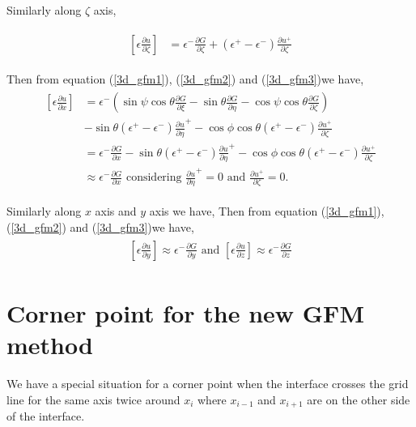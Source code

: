     Similarly along $\zeta $ axis, 
    
    \begin{eqnarray}
    \begin{aligned}
    \left[\epsilon \frac{\partial u}{\partial \zeta}\right]&= \epsilon^-\frac{\partial G}{\partial \zeta}+(\epsilon^+-\epsilon^-)\frac{\partial u^+}{\partial \zeta }\label{3d_gfm3}
    \end{aligned}
    \end{eqnarray}

    Then from equation (\ref{3d_gfm1}), (\ref{3d_gfm2}) and (\ref{3d_gfm3})we have,
    \begin{eqnarray}
    \begin{aligned}   
    		\left[\epsilon \frac{\partial u}{\partial x}\right]&= \epsilon^-\left( \sin \psi \cos \theta \frac{\partial G}{\partial \xi}-\sin \theta \frac{\partial G}{\partial \eta}-\cos \psi \cos \theta \frac{\partial G}{\partial \zeta}\right)\\
    		 &-\sin\theta (\epsilon^+-\epsilon^-)\frac{\partial u}{\partial \eta}^+ -\cos{\phi} \cos \theta (\epsilon^+-\epsilon^-) \frac{\partial u^+}{\partial \zeta }\\
    		 &=\epsilon^- \frac{\partial G}{\partial x}-\sin\theta (\epsilon^+-\epsilon^-)\frac{\partial u}{\partial \eta}^+ -\cos{\phi} \cos \theta (\epsilon^+-\epsilon^-) \frac{\partial u^+}{\partial \zeta }\\
    		 &\approx \epsilon^- \frac{\partial G}{\partial x}\text{     considering } \frac{\partial u}{\partial \eta}^+ =0 \text{ and } \frac{\partial u^+}{\partial \zeta }=0.  
    \end{aligned}		  	
    \end{eqnarray}

  Similarly along $x$ axis and $y$ axis we have, 
  Then from equation (\ref{3d_gfm1}), (\ref{3d_gfm2}) and (\ref{3d_gfm3})we have,
    \begin{eqnarray}
    \begin{aligned}  
   \left[\epsilon \frac{\partial u}{\partial y}\right]\approx\epsilon^- \frac{\partial G}{\partial y}\text{ and } \left[\epsilon \frac{\partial u}{\partial z}\right]\approx\epsilon^- \frac{\partial G}{\partial z}
    \end{aligned}		  	
    \end{eqnarray}

\section{Corner point for the new GFM method}
We have a special situation for a corner point when the interface crosses the grid line for the same axis twice around $x_i$ where $x_{i-1}$ and $x_{i+1}$ are on the other side of the interface.   
		

